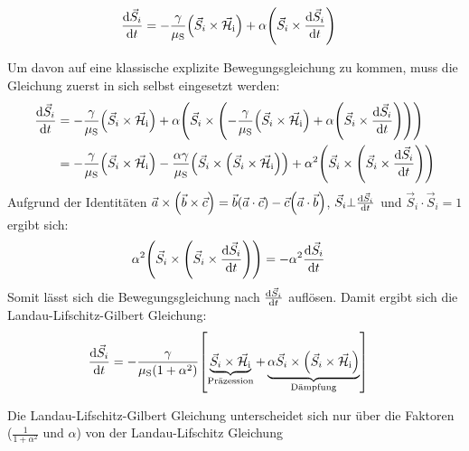 \documentclass[main.tex]{subfiles}
\begin{document}
\begin{align}
	\dv{\vec{S}_i}{t} & = -\frac{\gamma }{\mu_{\text{S}}}\qty(\vec{S}_i \times \vec{\mathcal{H}}_{\text{i}}) 
	+ \alpha \qty(\vec{S}_i \times \dv{\vec{S}_i}{t})
\end{align}

Um davon auf eine klassische explizite Bewegungsgleichung zu kommen, muss die
Gleichung zuerst in sich selbst eingesetzt werden:
\begin{align}
	\dv{\vec{S}_i}{t} & = -\frac{\gamma }{\mu_{\text{S}}}\qty(\vec{S}_i
	\times
	\vec{\mathcal{H}}_{\text{i}}) + \alpha \qty(\vec{S}_i \times
	\qty(-\frac{\gamma }{\mu_{\text{S}}}\qty(\vec{S}_i
		\times
		\vec{\mathcal{H}}_{\text{i}}) + \alpha \qty(\vec{S}_i \times
	\dv{\vec{S}_i}{t})))                                                \\
	                  & = -\frac{\gamma }{\mu_{\text{S}}}\qty(\vec{S}_i
	\times
	\vec{\mathcal{H}}_{\text{i}}) - \frac{\alpha\gamma}{\mu_\text{S}}
	\qty(\vec{S}_i \times \qty(\vec{S}_i \times
		\vec{\mathcal{H}}_{\text{i}})) +
	\alpha^2 \qty(\vec{S}_i \times \qty(\vec{S}_i \times
		\dv{\vec{S}_i}{t}))
\end{align}
Aufgrund der Identitäten \(\vec{a} \times \qty(\vec{b} \times \vec{c}) =
\vec{b} \qty(\vec{a} \cdot \vec{c}) - \vec{c} \qty(\vec{a} \cdot \vec{b})\),
\(\vec{S}_i \bot \dv{\vec{S}_i}{t}\) und \(\vec{S}_i \cdot \vec{S}_i = 1\)
ergibt sich:
\begin{align}
	\alpha^2 \qty(\vec{S}_i \times \qty(\vec{S}_i \times
	\dv{\vec{S}_i}{t})) & = -\alpha^2\dv{\vec{S}_i}{t}
\end{align}
Somit lässt sich die Bewegungsgleichung nach \(\dv{\vec{S}_i}{t}\) auflösen.
Damit ergibt sich die Landau-Lifschitz-Gilbert Gleichung:
\begin{align}
	\dv{\vec{S}_i}{t} & = -\frac{\gamma
	}{\mu_{\text{S}}(1+\alpha^2)}\qty[\underbrace{\vec{S}_i \times
			\vec{\mathcal{H}}_{\text{i}}}_\text{Präzession} +
		\underbrace{\alpha \vec{S}_i
			\times
			\qty(\vec{S}_i \times
			\vec{\mathcal{H}}_{\text{i}})}_\text{Dämpfung}]\label{eq:llg}
\end{align}

Die Landau-Lifschitz-Gilbert Gleichung unterscheidet sich nur über die Faktoren
(\(\frac{1
}{1 + \alpha^2}\) und \(\alpha\)) von der Landau-Lifschitz Gleichung
\end{document}
